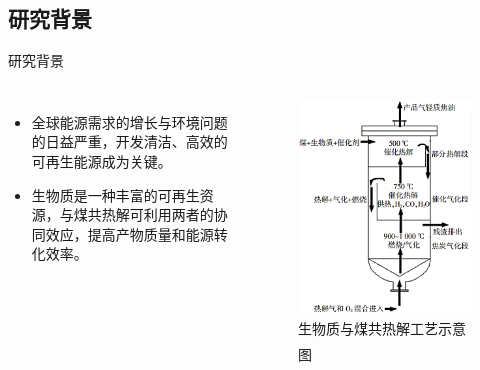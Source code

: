 \documentclass{beamer}
\newcommand{\upcite}[1]{\textsuperscript{\textsuperscript{ \cite{#1}}}}
\begin{document}
\subsection{研究背景}
\begin{frame}{研究背景}
    \justifying
    \begin{columns}
        \begin{itemize}
            \item 全球能源需求的增长与环境问题的日益严重，开发清洁、高效的可再生能源成为关键。
            \item 生物质是一种丰富的可再生资源，与煤共热解可利用两者的协同效应，提高产物质量和能源转化效率。
        \end{itemize}
        \begin{figure}[htbp]
            \centering
            \includegraphics[width=\linewidth]{pic/工艺示意图.png}
            \caption{生物质与煤共热解工艺示意图\upcite{ref13}}
        \end{figure}
    \end{columns}
\end{frame}
\end{document}
